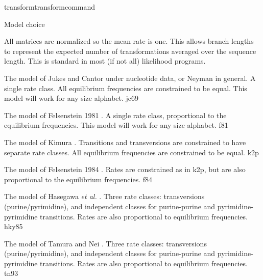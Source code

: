 \begin{command}{transform}{transformcommand}
\begin{arguments}
\begin {argumentgroup} {Model choice}
            \begin{statement}
                All matrices are normalized so the mean rate is one. This
                allows branch lengths to represent the expected number of
                transformations averaged over the sequence length. This is
                standard in most (if not all) likelihood programs.
            \end{statement}

                {The model of Jukes and Cantor \cite{jukesandcantor1969}
                under nucleotide data, or Neyman \cite{neyman1971} in general. A
                single rate class. All equilibrium frequencies are
                constrained to be equal. This model will work for any size
                alphabet.}
                {jc69}

                {The model of Felsenstein 1981 \cite{felsenstein1981}. A
                single rate class, proportional to the equilibrium
                frequencies. This model will work for any size
                alphabet.}
                {f81}

                {The model of Kimura \cite{kimura1980}. Transitions and
                transversions are constrained to have separate rate
                classes. All equilibrium frequencies are constrained to be
                equal.}
                {k2p}

                {The model of Felsenstein 1984 \cite{felsenstein1980}. Rates
                are constrained as in k2p, but are also proportional to
                the equilibrium frequencies.}
                {f84}

                {The model of Hasegawa \emph{et al.} \cite{hasegawa1984}. 
                Three rate classes:
                transversions (purine/pyrimidine), and independent
                classes for purine-purine and pyrimidine-pyrimidine
                transitions. Rates are also proportional to equilibrium
                frequencies.}
                {hky85}

                {The model of Tamura and Nei \cite{tamura1993}. Three
                rate classes: transversions (purine/pyrimidine), and
                independent classes for purine-purine and
                pyrimidine-pyrimidine transitions. Rates are also
                proportional to equilibrium frequencies.}
                {tn93}


\end{argumentgroup}
\end{arguments}
\end{command}
